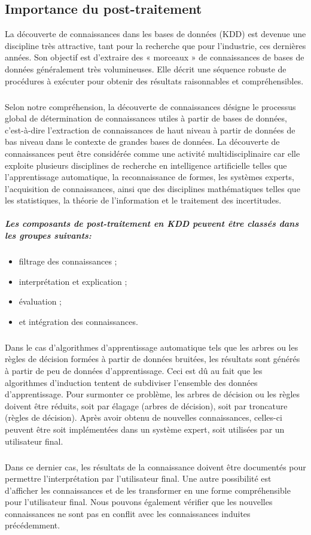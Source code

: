 \documentclass[a4paper, 12pt]{article}
\begin{document}
	\subsection{Importance du post-traitement}La découverte de connaissances dans les bases de données (KDD) est devenue une discipline très attractive, tant pour la recherche que pour l'industrie, ces dernières années. Son objectif est d'extraire des « morceaux » de connaissances de bases de données généralement très volumineuses. Elle décrit une séquence robuste de procédures à exécuter pour obtenir des résultats raisonnables et compréhensibles. 
	\subparagraph{}Selon notre compréhension, la découverte de connaissances désigne le processus global de détermination de connaissances utiles à partir de bases de données, c'est-à-dire l'extraction de connaissances de haut niveau à partir de données de bas niveau dans le contexte de grandes bases de données. La découverte de connaissances peut être considérée comme une activité multidisciplinaire car elle exploite plusieurs disciplines de recherche en intelligence artificielle telles que l'apprentissage automatique, la reconnaissance de formes, les systèmes experts, l'acquisition de connaissances, ainsi que des disciplines mathématiques telles que les statistiques, la théorie de l'information et le traitement des incertitudes.
	\subparagraph{Les composants de post-traitement en KDD peuvent être classés dans les groupes suivants: }
	\begin{itemize}
		\item filtrage des connaissances ; 
		\item interprétation et explication ; 
		\item évaluation ; 
		\item et intégration des connaissances.
	\end{itemize}
	\subparagraph{}Dans le cas d'algorithmes d'apprentissage automatique tels que les arbres ou les règles de  décision formées à partir de données bruitées, les résultats sont générés à partir de peu de données d'apprentissage. Ceci est dû au fait que les algorithmes d'induction tentent de subdiviser l'ensemble des données d'apprentissage. Pour surmonter ce problème, les arbres de décision ou les règles doivent être réduits, soit par élagage (arbres de décision), soit par troncature (règles de décision). Après avoir obtenu de nouvelles connaissances, celles-ci peuvent être soit implémentées dans un système expert, soit utilisées par un utilisateur final. 
	\subparagraph{}Dans ce dernier cas, les résultats de la connaissance doivent être documentés pour permettre l'interprétation par l'utilisateur final. Une autre possibilité est d'afficher les connaissances et de les transformer en une forme compréhensible pour l'utilisateur final. Nous pouvons également vérifier que les nouvelles connaissances ne sont pas en conflit avec les connaissances induites précédemment. 
\end{document}
